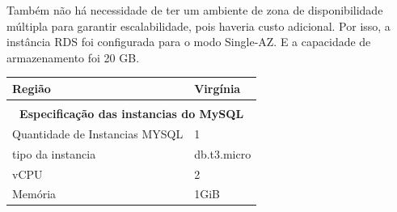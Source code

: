Também não há necessidade de ter um ambiente de zona de disponibilidade múltipla para garantir escalabilidade, pois haveria custo adicional. Por isso, a instância RDS foi configurada para o modo Single-AZ. E a capacidade de armazenamento foi 20 GB.


\begin{table}[]
\begin{tabular}{|ll|}
\hline
\multicolumn{1}{|l|}{\textbf{Região}}                 & Virgínia     \\ \hline
\multicolumn{1}{|l|}{}                                &              \\ \hline
\multicolumn{2}{|c|}{\textbf{Especificação das instancias do MySQL}} \\ \hline
\multicolumn{1}{|l|}{Quantidade de Instancias MYSQL}  & 1            \\ \hline
\multicolumn{1}{|l|}{tipo da instancia}               & db.t3.micro  \\ \hline
\multicolumn{1}{|l|}{vCPU}                            & 2            \\ \hline
\multicolumn{1}{|l|}{Memória}                         & 1GiB         \\ \hline
\end{tabular}
\end{table}